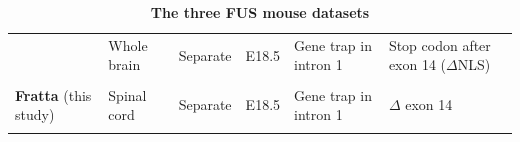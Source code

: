 \begin{longtable}[t]{@{}llllll@{}}
\begin{minipage}[t]{0.16\columnwidth}
	\end{minipage} & \begin{minipage}[t]{0.14\columnwidth}\raggedright\strut
		{Whole brain}\strut
	\end{minipage} & \begin{minipage}[t]{0.12\columnwidth}\raggedright\strut
		{Separate}\strut
	\end{minipage} & \begin{minipage}[t]{0.10\columnwidth}\raggedright\strut
		{E18.5}\strut
	\end{minipage} & \begin{minipage}[t]{0.16\columnwidth}\raggedright\strut
		{Gene trap in intron 1}\strut
	\end{minipage} & \begin{minipage}[t]{0.16\columnwidth}\raggedright\strut
		{Stop codon after exon 14 ($\Delta$NLS)}\strut
	\end{minipage}\tabularnewline \\
	\begin{minipage}[t]{0.16\columnwidth}\raggedright\strut
		{\textbf{Fratta}}
		{(this study)}\strut
	\end{minipage} & \begin{minipage}[t]{0.14\columnwidth}\raggedright\strut
		{Spinal cord}\strut
	\end{minipage} & \begin{minipage}[t]{0.12\columnwidth}\raggedright\strut
		{Separate}\strut
	\end{minipage} & \begin{minipage}[t]{0.10\columnwidth}\raggedright\strut
		{E18.5}\strut
	\end{minipage} & \begin{minipage}[t]{0.16\columnwidth}\raggedright\strut
		{Gene trap in intron 1}\strut
	\end{minipage} & \begin{minipage}[t]{0.16\columnwidth}\raggedright\strut
		{$\Delta$ exon 14 } \strut
	\end{minipage}\tabularnewline
	\caption{\textbf{The three FUS mouse datasets}}
	\label{tab:fus_datasets}
\end{longtable}


